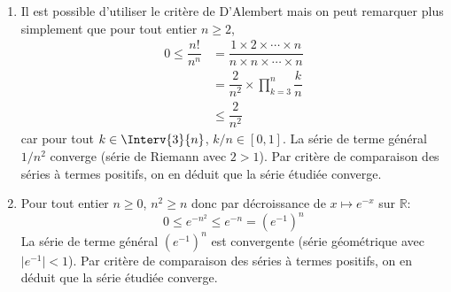 \documentclass[a4paper,twoside,french,10pt]{VcCours}
\begin{document}
\begin{enumerate}
%
\item Il est possible d'utiliser le critère de D'Alembert mais on peut remarquer plus simplement que pour tout entier $n \geq 2$,
\begin{align*}
 0 \leq \dfrac{n!}{n^n} & = \dfrac{1 \times 2 \times \cdots \times n}{n \times n \times \cdots \times n} \\
 & = \dfrac{2}{n^2} \times \prod_{k=3}^n \dfrac{k}{n} \\
 & \leq \dfrac{2}{n^2}
 \end{align*}
car pour tout $k \in \Interv{3}{n}$, $k/n \in [0,1]$. La série de terme général $1/n^2$ converge (série de Riemann avec $2>1$). Par critère de comparaison des séries à termes positifs, on en déduit que la série étudiée converge.
\item Pour tout entier $n \geq 0$, $n^2 \geq n$ donc par décroissance de $x \mapsto e^{-x}$ sur $\mathbb{R}$:
$$ 0 \leq e^{-n^2} \leq e^{-n} = (e^{-1})^n$$
La série de terme général $(e^{-1})^n$ est convergente (série géométrique avec $\vert e^{-1}\vert <1$). Par critère de comparaison des séries à termes positifs, on en déduit que la série étudiée converge.

\medskip


\end{enumerate}
\end{document}
